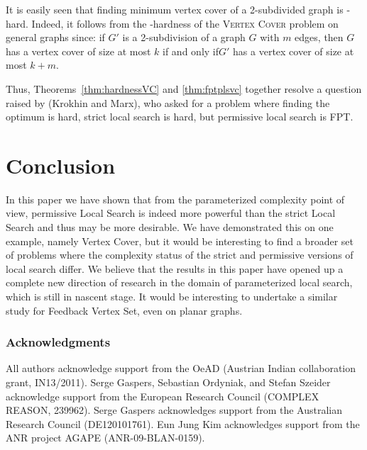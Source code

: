 \documentclass[10pt,usletter]{article}
\newcommand{\NP}{\text{\normalfont NP}}
\newcommand{\myiff}{if and only if\xspace}
\begin{document}
It is easily seen that finding minimum vertex cover of a 2-subdivided graph is \NP-hard. Indeed, it follows from the \NP-hardness of the \textsc{Vertex Cover} problem on general graphs since: if $G'$ is a 2-subdivision of a graph $G$ with $m$ edges, then $G$ has a vertex
cover of size at most $k$ \myiff $G'$ has a vertex cover of size at most $k+m$.

Thus, Theorems~\ref{thm:hardnessVC} and \ref{thm:fptplsvc} together resolve a question raised by (Krokhin and Marx), who asked for a problem where finding the optimum is hard, 
strict local search is hard, but permissive local search is FPT. 


\section{Conclusion}
In this paper we have shown that from the parameterized complexity point of view,
permissive Local Search is  indeed more powerful than the strict Local Search and thus may 
be more desirable.  We have demonstrated this on one example, namely {\sc Vertex Cover},  but it would
be interesting to find a broader set of problems where the complexity status 
of the strict and permissive versions of local search differ.  We believe that the results in 
this paper have opened up a complete new direction of research in the domain of parameterized local search, 
which is still in nascent stage. It would be interesting to undertake a similar study for {\sc Feedback Vertex Set}, 
even on planar graphs.

\subsubsection*{Acknowledgments}

All authors acknowledge support from the OeAD (Austrian Indian collaboration grant, IN13/2011).  
Serge Gaspers, Sebastian Ordyniak, and Stefan Szeider
acknowledge support from the European Research Council (COMPLEX REASON, 239962).
Serge Gaspers acknowledges support from the
Australian Research Council (DE120101761).
Eun Jung Kim acknowledges support from
the ANR project AGAPE (ANR-09-BLAN-0159).
\end{document}
